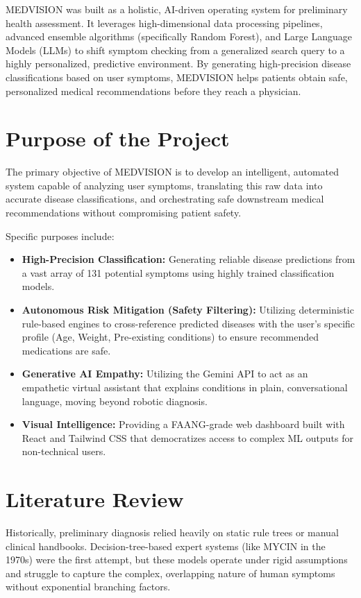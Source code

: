 \documentclass[12pt,a4paper]{report}
\begin{document}
MEDVISION was built as a holistic, AI-driven operating system for preliminary health assessment. It leverages high-dimensional data processing pipelines, advanced ensemble algorithms (specifically Random Forest), and Large Language Models (LLMs) to shift symptom checking from a generalized search query to a highly personalized, predictive environment. By generating high-precision disease classifications based on user symptoms, MEDVISION helps patients obtain safe, personalized medical recommendations before they reach a physician.

\section{Purpose of the Project}
The primary objective of MEDVISION is to develop an intelligent, automated system capable of analyzing user symptoms, translating this raw data into accurate disease classifications, and orchestrating safe downstream medical recommendations without compromising patient safety.

Specific purposes include:
\begin{itemize}
    \item \textbf{High-Precision Classification:} Generating reliable disease predictions from a vast array of 131 potential symptoms using highly trained classification models.
    \item \textbf{Autonomous Risk Mitigation (Safety Filtering):} Utilizing deterministic rule-based engines to cross-reference predicted diseases with the user's specific profile (Age, Weight, Pre-existing conditions) to ensure recommended medications are safe.
    \item \textbf{Generative AI Empathy:} Utilizing the Gemini API to act as an empathetic virtual assistant that explains conditions in plain, conversational language, moving beyond robotic diagnosis.
    \item \textbf{Visual Intelligence:} Providing a FAANG-grade web dashboard built with React and Tailwind CSS that democratizes access to complex ML outputs for non-technical users.
\end{itemize}

\section{Literature Review}
Historically, preliminary diagnosis relied heavily on static rule trees or manual clinical handbooks. Decision-tree-based expert systems (like MYCIN in the 1970s) were the first attempt, but these models operate under rigid assumptions and struggle to capture the complex, overlapping nature of human symptoms without exponential branching factors.
\end{document}
